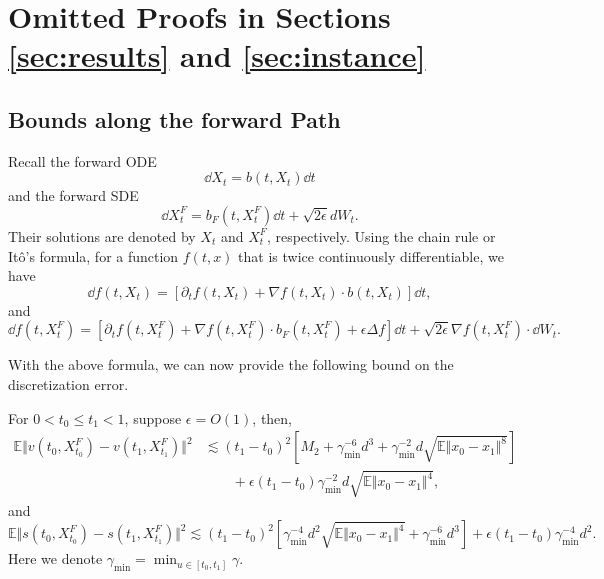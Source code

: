 
\section{Omitted Proofs in Sections \ref{sec:results} and \ref{sec:instance}}
\label{appendix:overall}

\subsection{Bounds along the forward Path}

Recall the forward ODE $$\dd X_t=b(t,X_t)\dd t$$
and the forward SDE $$\dd X_t^F=b_F(t,X_t^F)\dd t+\sqrt{2\epsilon}dW_t.$$
Their solutions are denoted by $X_t$ and $X_t^F$, respectively. Using the chain rule or It\^o's formula, for a function $f(t,x)$ that is twice continuously differentiable, we have 
$$\dd f(t,X_t)=[\partial_tf(t,X_t)+\nabla f(t,X_t)\cdot b(t,X_t)]\dd t,$$
and $$\dd f(t,X_t^F)=[\partial_tf(t,X_t^F)+\nabla f(t,X_t^F)\cdot b_F(t,X_t^F)+\epsilon\Delta f]\dd t+\sqrt{2\epsilon}\nabla f(t,X_t^F)\cdot \dd W_t.$$

With the above formula, we can now provide the following bound on the discretization error.

\begin{lemma}
    For $0<t_0\le t_1<1$, suppose $\epsilon=O(1)$, then,
    $$\begin{aligned}
        \mathbb{E}\Vert v(t_0,X_{t_0}^F)-v(t_1,X_{t_1}^F)\Vert^2&\lesssim(t_1-t_0)^2\left[M_2+\gamma_{\min}^{-6}d^3+\gamma_{\min}^{-2}d\sqrt{\mathbb{E}\Vert x_0-x_1\Vert^{8}}\right]\\
        &\qquad+\epsilon(t_1-t_0)\gamma_{\min}^{-2}d\sqrt{\mathbb{E}\Vert x_0-x_1\Vert^{4}},
    \end{aligned}$$
    and $$\mathbb{E}\Vert s(t_0,X_{t_0}^F)-s(t_1,X_{t_1}^F)\Vert^2\lesssim(t_1-t_0)^2\left[\gamma_{\min}^{-4}d^2\sqrt{\mathbb{E}\Vert x_0-x_1\Vert^4}+\gamma_{\min}^{-6}d^3\right]+\epsilon(t_1-t_0)\gamma_{\min}^{-4}d^2.$$
    Here we denote $\gamma_{\min}=\min_{u\in[t_0,t_1]}\gamma$.
    \label{lem:discretize}
\end{lemma}

